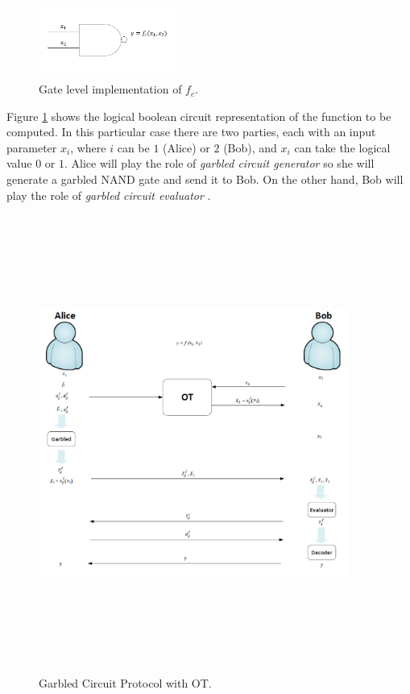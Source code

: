 \begin{refsection}
\begin{figure}[H]
	\centering
	\includegraphics[width=0.4\textwidth, height=2.5cm]{./sdf/secure_multiparty_computation/figures/nand.png}
    \caption{Gate level implementation of $f_c$.}\label{fig:andGate}
\end{figure}

Figure \ref{fig:andGate} shows the logical boolean circuit representation of the function to be computed. In this particular case there are two parties, each with an input parameter $x_i$, where $i$ can be $1$ (Alice) or $2$ (Bob), and $x_i$ can take the logical value $0$ or $1$. Alice will play the role of \textit{garbled circuit generator} so she will generate a garbled NAND gate and send it to Bob. On the other hand, Bob will play the role of \textit{garbled circuit evaluator} \cite{Yakoubov}.

\begin{figure}[H]
	\centering
	\includegraphics[width=0.9\textwidth, height=15cm]{./sdf/secure_multiparty_computation/figures/smc_with_ot_ANP.png}
    \caption{Garbled Circuit Protocol with OT.}\label{fig:smcwithot}
\end{figure}




\end{refsection}
